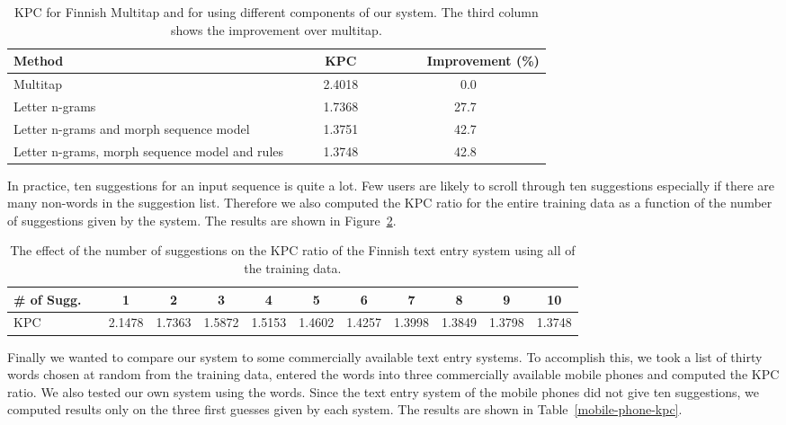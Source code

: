 \documentclass{llncs}
\begin{document}
\begin{table}
\begin{center}
\caption{KPC for Finnish Multitap and for using different components of
  our system. The third column shows the improvement over
  multitap.}\label{Finnish-kpc-table}
\begin{tabular}{lcr}
\hline
Method ~~~~& ~~~~KPC~~~~ &~~~~Improvement (\%)\\
\hline
Multitap                                       &2.4018 & 0.0~~~~~~~~~~\\
Letter n-grams                                 &1.7368 & 27.7~~~~~~~~~~\\
Letter n-grams and morph sequence model        &1.3751 & 42.7~~~~~~~~~~\\
Letter n-grams, morph sequence model and rules &1.3748 & 42.8~~~~~~~~~~\\
\hline
\end{tabular}
\end{center}
\end{table}

In practice, ten suggestions for an input sequence is quite a lot. Few
users are likely to scroll through ten suggestions especially if there
are many non-words in the suggestion list. Therefore we also computed
the KPC ratio for the entire training data as a function of the number
of suggestions given by the system. The results are shown in
Figure~\ref{fi-kpc-suggestions}.

\begin{table}\label{fi-kpc-suggestions}
\caption{The effect of the number of suggestions on the KPC ratio of the Finnish text entry system using all of the training data.}
\begin{center}
\begin{tabular}{lcccccccccc}
\hline
\# of Sugg.~~&  1 & 2 & 3 & 4 & 5 & 6 & 7 & 8 & 9 & 10\\
\hline
KPC & 2.1478 & 1.7363 & 1.5872 & 1.5153 & 1.4602 & 1.4257 & 1.3998 & 1.3849 & 1.3798 & 1.3748\\
\hline
\end{tabular}
\end{center}
\end{table}

Finally we wanted to compare our system to some commercially available
text entry systems. To accomplish this, we took a list of thirty words
chosen at random from the training data, entered the words into three
commercially available mobile phones and computed the KPC ratio. We
also tested our own system using the words. Since the text entry
system of the mobile phones did not give ten suggestions, we computed
results only on the three first guesses given by each system. The
results are shown in Table~\ref{mobile-phone-kpc}.
\end{document}
